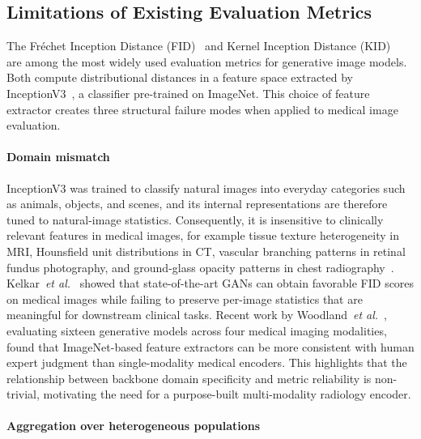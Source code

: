 \documentclass[lettersize,journal]{IEEEtran}
\begin{document}
\subsection{Limitations of Existing Evaluation Metrics}
\label{sec:why_fail}

The Fr\'{e}chet Inception Distance (FID)~\cite{heusel2017gans} and
Kernel Inception Distance (KID)~\cite{binkowski2018demystifying} are
among the most widely used evaluation metrics for generative image
models. Both compute distributional distances in a feature space
extracted by InceptionV3~\cite{szegedy2016rethinking}, a classifier
pre-trained on ImageNet. This choice of feature extractor creates
three structural failure modes when applied to medical image
evaluation.

\paragraph{Domain mismatch}
InceptionV3 was trained to classify natural images into everyday
categories such as animals, objects, and scenes, and its internal
representations are therefore tuned to natural-image statistics.
Consequently, it is insensitive to clinically relevant features in
medical images, for example tissue texture heterogeneity in MRI,
Hounsfield unit distributions in CT, vascular branching patterns
in retinal fundus photography, and ground-glass opacity patterns
in chest radiography~\cite{kelkar2023assessing,skandarani2023gans}.
Kelkar~\textit{et al.}~\cite{kelkar2023assessing} showed that
state-of-the-art GANs can obtain favorable FID scores on medical
images while failing to preserve per-image statistics that are
meaningful for downstream clinical tasks. Recent work by Woodland~\textit{et al.}~\cite{woodland2024feature}, evaluating sixteen generative models across four medical imaging modalities, found that ImageNet-based feature extractors can be more consistent with human expert judgment than single-modality medical encoders. This highlights that the relationship between backbone domain specificity and metric reliability is non-trivial, motivating the need for a purpose-built multi-modality radiology encoder.

\paragraph{Aggregation over heterogeneous populations}
\end{document}
